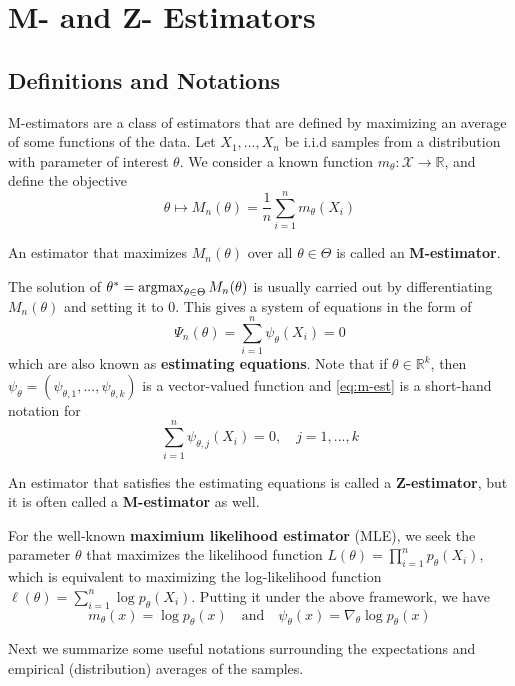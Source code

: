\documentclass{article}
\begin{document}
\setcounter{section}{4}
\section{M- and Z- Estimators}
\subsection{Definitions and Notations}
M-estimators are a class of estimators that are defined by maximizing an average of some functions of the data. Let $X_1, ..., X_n$ be i.i.d samples from a distribution with parameter of interest $\theta$. We consider a known function $m_\theta:\mathcal{X} \to \mathbb{R}$, and define the objective
\begin{equation}
    \theta \mapsto M_n(\theta) = \frac{1}{n} \sum_{i=1}^{n} m_\theta(X_i)
\end{equation} 
\begin{definition}
    An estimator that maximizes $M_n(\theta)$ over all $\theta \in \Theta$ is called an \textbf{M-estimator}.
\end{definition}
The solution of $\theta^* = \mathop{\mathrm{argmax}}_{\theta \in \Theta} M_n(\theta)$ is usually carried out by differentiating $M_n(\theta)$ and setting it to 0. This gives a system of equations in the form of 
\begin{equation}\label{eq:m-est}
    \Psi_n(\theta) = \sum_{i=1}^{n} \psi_\theta(X_i) = 0
\end{equation}
which are also known as \textbf{estimating equations}. Note that if $\theta \in \mathbb{R}^k$, then $\psi_\theta = (\psi_{\theta, 1}, ..., \psi_{\theta, k})$ is a vector-valued function and \ref{eq:m-est} is a short-hand notation for
\begin{equation}
    \sum_{i=1}^{n} \psi_{\theta, j}(X_i) = 0, \quad  j = 1, ..., k
\end{equation}
\begin{definition}
    An estimator that satisfies the estimating equations is called a \textbf{Z-estimator}, but it is often called a \textbf{M-estimator} as well.
\end{definition}
\begin{example}
    For the well-known \textbf{maximium likelihood estimator} (MLE), we seek the parameter $\theta$ that maximizes the likelihood function $L(\theta) = \prod_{i=1}^{n} p_\theta(X_i)$, which is equivalent to maximizing the log-likelihood function $\ell(\theta) = \sum_{i=1}^{n} \log p_\theta(X_i)$. Putting it under the above framework, we have 
    \begin{equation*}
        m_\theta(x) = \log p_\theta(x) \quad \text{and} \quad \psi_\theta(x) = \nabla_\theta \log p_\theta(x)
    \end{equation*}
\end{example}
Next we summarize some useful notations surrounding the expectations and empirical (distribution) averages of the samples.
\end{document}
